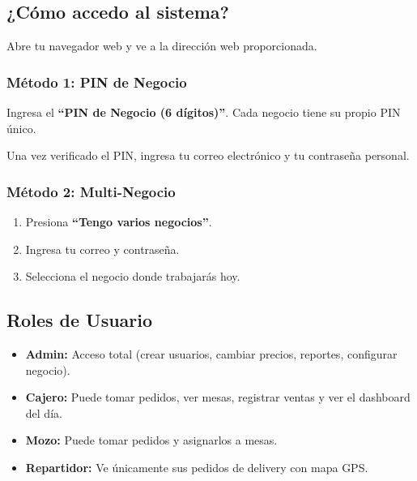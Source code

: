 \documentclass[10pt,a4paper,twoside]{article}
\begin{document}
\subsection{¿Cómo accedo al sistema?}

Abre tu navegador web y ve a la dirección web proporcionada.

\subsubsection{Método 1: PIN de Negocio}

\begin{stepbox}
Ingresa el \textbf{``PIN de Negocio (6 dígitos)''}. Cada negocio tiene su propio PIN único.
\end{stepbox}

\begin{stepbox}
Una vez verificado el PIN, ingresa tu correo electrónico y tu contraseña personal.
\end{stepbox}

\subsubsection{Método 2: Multi-Negocio}

\begin{stepbox}
\begin{enumerate}[itemsep=1pt, leftmargin=15pt]
    \item Presiona \textbf{``Tengo varios negocios''}.
    \item Ingresa tu correo y contraseña.
    \item Selecciona el negocio donde trabajarás hoy.
\end{enumerate}
\end{stepbox}

\subsection{Roles de Usuario}

\begin{itemize}[itemsep=2pt, leftmargin=15pt]
    \item \textcolor{kodefyBlue}{\textbf{Admin:}} Acceso total (crear usuarios, cambiar precios, reportes, configurar negocio).
    \item \textcolor{kodefyGreen}{\textbf{Cajero:}} Puede tomar pedidos, ver mesas, registrar ventas y ver el dashboard del día.
    \item \textcolor{kodefyOrange}{\textbf{Mozo:}} Puede tomar pedidos y asignarlos a mesas.
    \item \textcolor{kodefyRed}{\textbf{Repartidor:}} Ve únicamente sus pedidos de delivery con mapa GPS.
\end{itemize}
\end{document}
